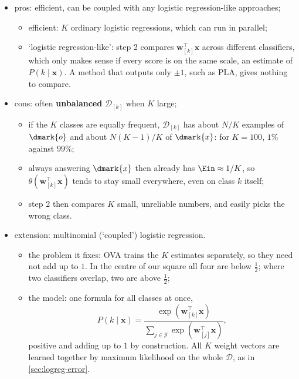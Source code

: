 \begin{itemize}
    \item pros: efficient, can be coupled with any logistic regression-like
        approaches;
        \begin{itemize}
            \item efficient: \(K\) ordinary logistic regressions, which can
                run in parallel;
            \item `logistic regression-like': step 2 compares
                \(\bm{w}_{[k]}^\top \bm{x}\) across different classifiers,
                which only makes sense if every score is on the same scale,
                an estimate of \(P(k \mid \bm{x})\). A method that outputs
                only \(\pm 1\), such as PLA, gives nothing to compare.
        \end{itemize}
    \item cons: often \textcolor{orange!85!black}{\textbf{unbalanced}}
        \(\mathcal{D}_{[k]}\) when \(K\) large;
        \begin{itemize}
            \item if the \(K\) classes are equally frequent,
                \(\mathcal{D}_{[k]}\) has about \(N/K\) examples of
                \(\dmark{o}\) and about \({N(K-1)/K}\) of \(\dmark{x}\): for
                \(K = 100\), \(1\%\) against \(99\%\);
            \item always answering \(\dmark{x}\) then already has \(\Ein
                \approx 1/K\), so \(\theta(\bm{w}_{[k]}^\top \bm{x})\) tends
                to stay small everywhere, even on class \(k\) itself;
            \item step 2 then compares \(K\) small, unreliable numbers, and
                easily picks the wrong class.
        \end{itemize}
    \item extension: multinomial (`coupled') logistic regression.
        \begin{itemize}
            \item the problem it fixes: OVA trains the \(K\) estimates
                separately, so they need not add up to \(1\). In the centre
                of our square all four are below \(\frac{1}{2}\); where two
                classifiers overlap, two are above \(\frac{1}{2}\);
            \item the model: one formula for all classes at once,
                \[
                    P(k \mid \bm{x}) = \frac{\exp(\bm{w}_{[k]}^\top
                    \bm{x})}{\sum_{j \in \mathcal{Y}} \exp(\bm{w}_{[j]}^\top
                    \bm{x})} ,
                \]
                positive and adding up to \(1\) by construction. All \(K\)
                weight vectors are learned together by maximum likelihood on
                the whole \(\mathcal{D}\), as in \autoref{sec:logreg-error}.
        \end{itemize}
\end{itemize}

